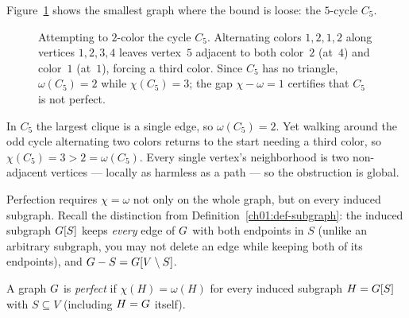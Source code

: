 Figure~\ref{ch30:fig-c5} shows the smallest graph where the bound is loose: the $5$-cycle $C_5$.

\begin{figure}[htbp]
\centering
{}
\caption{Attempting to $2$-color the cycle $C_5$. Alternating colors $1,2,1,2$ along vertices $1,2,3,4$ leaves vertex~$5$ adjacent to both color~$2$ (at~$4$) and color~$1$ (at~$1$), forcing a third color. Since $C_5$ has no triangle, $\omega(C_5)=2$ while $\chi(C_5)=3$; the gap $\chi-\omega=1$ certifies that $C_5$ is not perfect.}
\label{ch30:fig-c5}
\end{figure}

In $C_5$ the largest clique is a single edge, so $\omega(C_5)=2$. Yet walking around the odd cycle alternating two colors returns to the start needing a third color, so $\chi(C_5)=3>2=\omega(C_5)$. Every single vertex's neighborhood is two non-adjacent vertices --- locally as harmless as a path --- so the obstruction is global.

Perfection requires $\chi=\omega$ not only on the whole graph, but on every induced subgraph. Recall the distinction from Definition~\ref{ch01:def-subgraph}: the induced subgraph $G[S]$ keeps \emph{every} edge of $G$ with both endpoints in $S$ (unlike an arbitrary subgraph, you may not delete an edge while keeping both of its endpoints), and $G-S=G[V\setminus S]$.

\begin{definition}\label{ch30:def-perfect}
A graph $G$ is \emph{perfect} if $\chi(H)=\omega(H)$ for every induced subgraph $H=G[S]$ with $S\subseteq V$ (including $H=G$ itself).
\end{definition}

